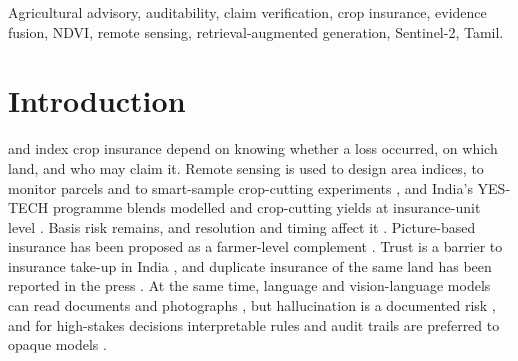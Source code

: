 \documentclass{ieeeaccess}
\begin{document}
\begin{keywords}
Agricultural advisory, auditability, claim verification, crop insurance, evidence fusion, NDVI, remote sensing, retrieval-augmented generation, Sentinel-2, Tamil.
\end{keywords}

\titlepgskip=-21pt

\maketitle

\section{Introduction}
 and index crop insurance depend on knowing whether a loss occurred, on which land, and who may claim it. Remote sensing is used to design area indices, to monitor parcels and to smart-sample crop-cutting experiments \cite{okeyo2020,sitokonstantinou2018,murthy2019smart}, and India's YES-TECH programme blends modelled and crop-cutting yields at insurance-unit level \cite{mncfc2023yestech}. Basis risk remains, and resolution and timing affect it \cite{kolle2021,dalhaus2016,carter2017}. Picture-based insurance has been proposed as a farmer-level complement \cite{ceballos2019}. Trust is a barrier to insurance take-up in India \cite{cole2013}, and duplicate insurance of the same land has been reported in the press \cite{tribune2023cotton}. At the same time, language and vision-language models can read documents and photographs \cite{gemini2023,kim2022}, but hallucination is a documented risk \cite{ji2023}, and for high-stakes decisions interpretable rules and audit trails are preferred to opaque models \cite{rudin2019,raji2020}.
\end{document}
